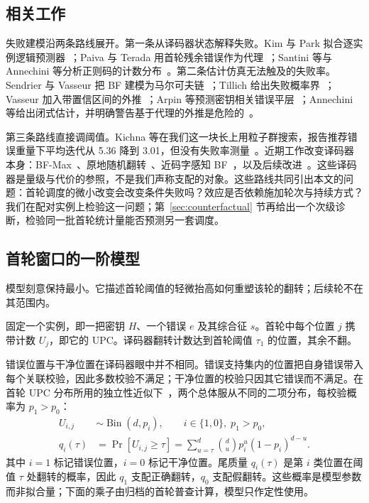 \documentclass[UTF8,a4paper,10pt,onecolumn]{ctexart}
\begin{document}
\subsection{相关工作}

失败建模沿两条路线展开。第一条从译码器状态解释失败。Kim 与 Park 拟合逐实例逻辑预测器~\cite{kim2021logistic}；Paiva 与 Terada 用首轮残余错误作为代理~\cite{paiva2022pickyfix}；Santini 等与 Annechini 等分析正则码的计数分布~\cite{santini2019conservative,annechini2024estimation}。第二条估计仿真无法触及的失败率。Sendrier 与 Vasseur 把 BF 建模为马尔可夫链~\cite{sendrier2019dfr,sendrier2020lowdfr}；Tillich 给出失败概率界~\cite{tillich2018dfp}；Vasseur 加入带置信区间的外推~\cite{vasseur2021thesis}；Arpin 等预测密钥相关错误平层~\cite{arpin2025errorfloor}；Annechini 等给出闭式估计，并明确警告基于代理的外推是危险的~\cite{annechini2025closedform}。

第三条路线直接调阈值。Kichna 等在我们这一块长上用粒子群搜索，报告推荐错误重量下平均迭代从 5.36 降到 3.01，但没有失败率测量~\cite{kichna2025pso}。近期工作改变译码器本身：BF-Max~\cite{baldelli2025bfmax}、原地随机翻转~\cite{baldi2021inplace}、近码字感知 BF~\cite{baldelli2026ncw}，以及后续改进~\cite{santini2026flip}。这些译码器是量级与代价的参照，不是我们声称支配的对象。这些路线共同引出本文的问题：首轮调度的微小改变会改变条件失败吗？效应是否依赖施加轮次与持续方式？我们在配对实例上检验这一问题；第~\ref{sec:counterfactual} 节再给出一个次级诊断，检验同一批首轮统计量能否预测另一套调度。
\subsection{首轮窗口的一阶模型}\label{sec:model}

模型刻意保持最小。它描述首轮阈值的轻微抬高如何重塑该轮的翻转；后续轮不在其范围内。

固定一个实例，即一把密钥 $H$、一个错误 $e$ 及其综合征 $s$。首轮中每个位置 $j$ 携带计数 $U_j$，即它的 UPC。译码器翻转计数达到首轮阈值 $\tau_1$ 的位置，其余不翻。

错误位置与干净位置在译码器眼中并不相同。错误支持集内的位置把自身错误带入每个关联校验，因此多数校验不满足；干净位置的校验只因其它错误而不满足。在首轮 UPC 分布所用的独立性近似下~\cite{annechini2024estimation}，两个总体服从不同的二项分布，每校验概率为 $p_1>p_0$：
\begin{equation}\label{eq:upc-tails}
\begin{aligned}
U_{i,j} &\sim \operatorname{Bin}(d,p_i), \qquad i\in\{1,0\},\; p_1>p_0,\\
q_i(\tau) &= \Pr[U_{i,j}\ge\tau]
= \textstyle\sum_{u=\tau}^{d}\binom{d}{u}p_i^{u}(1-p_i)^{d-u}.
\end{aligned}
\end{equation}
其中 $i=1$ 标记错误位置，$i=0$ 标记干净位置。尾质量 $q_i(\tau)$ 是第 $i$ 类位置在阈值 $\tau$ 处翻转的概率，因此 $q_1$ 支配正确翻转，$q_0$ 支配假翻转。这些概率是模型参数而非拟合量；下面的乘子由归档的首轮普查计算，模型只作定性使用。
\end{document}
